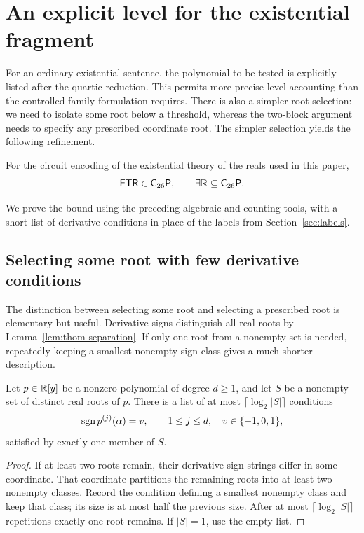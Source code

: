 \section{An explicit level for the existential fragment}
\label{sec:existential-bound}

For an ordinary existential sentence, the polynomial to be tested is
explicitly listed after the quartic reduction.  This permits more precise
level accounting than the controlled-family formulation requires.
There is also a simpler root selection: we need to isolate some root below
a threshold, whereas the two-block argument needs to specify any prescribed
coordinate root.  The simpler selection yields the following refinement.

\begin{theorem}\label{thm:etr-bound}
For the circuit encoding of the existential theory of the reals used in
this paper,
\[
 \mathsf{ETR}\in\mathsf C_{26}\mathsf P,
 \qquad \exists\mathbb R\subseteq\mathsf C_{26}\mathsf P.
\]
\end{theorem}

We prove the bound using the preceding algebraic and counting tools,
with a short list of derivative conditions in place of the labels from
Section~\ref{sec:labels}.

\subsection{Selecting some root with few derivative conditions}

The distinction between selecting some root and selecting a prescribed
root is elementary but useful.  Derivative signs distinguish all real
roots by Lemma~\ref{lem:thom-separation}.  If only one root from a
nonempty set is needed, repeatedly keeping a smallest nonempty sign
class gives a much shorter description.

\begin{lemma}\label{lem:sparse-selection}
Let $p\in\mathbb R[y]$ be a nonzero polynomial of degree $d\ge1$, and let
$S$ be a nonempty set of distinct real roots of $p$.  There is a list
of at most $\lceil\log_2|S|\rceil$ conditions
\[
 \operatorname{sgn} p^{(j)}(\alpha)=v,
 \qquad 1\le j\le d,\quad v\in\{-1,0,1\},
\]
satisfied by exactly one member of $S$.
\end{lemma}

\begin{proof}
If at least two roots remain, their derivative sign strings differ in
some coordinate.  That coordinate partitions the remaining roots into
at least two nonempty classes.  Record the condition defining a smallest
nonempty class and keep that class; its size is at most half the previous
size.  After at most $\lceil\log_2|S|\rceil$ repetitions exactly one
root remains.  If $|S|=1$, use the empty list.
\end{proof}

